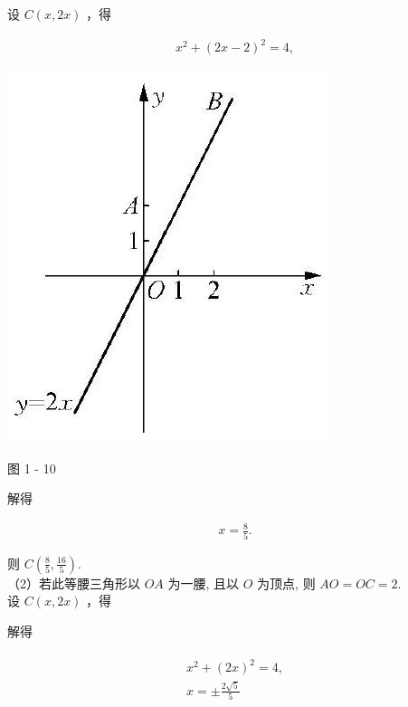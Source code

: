 \documentclass[10pt]{article}
\begin{document}
设 $C(x, 2 x)$ ，得

\begin{align*}
x^{2}+(2 x-2)^{2}=4,
\end{align*}

\begin{center}
\includegraphics[max width=\textwidth]{2024_10_30_1bf34f7aeb61f11d11d3g-020}
\end{center}

图 1 - 10

解得

\begin{align*}
x=\frac{8}{5} .
\end{align*}

则 $C\left(\frac{8}{5}, \frac{16}{5}\right)$.\\
（2）若此等腰三角形以 $O A$ 为一腰, 且以 $O$ 为顶点, 则 $A O=O C=2$.\\
设 $C(x, 2 x)$ ，得

解得

\begin{align*}
\begin{gathered}
x^{2}+(2 x)^{2}=4, \\
x= \pm \frac{2 \sqrt{5}}{5}
\end{gathered}
\end{align*}
\end{document}
